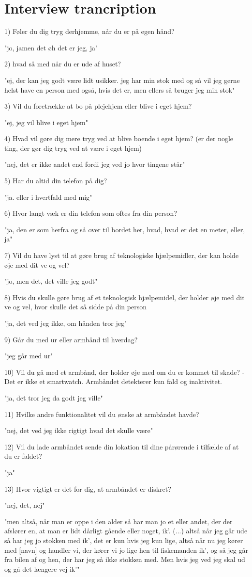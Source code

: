 \section{Interview trancription}

1) Føler du dig tryg derhjemme, når du er på egen hånd?

"jo, jamen det øh det er jeg, ja"

2) hvad så med når du er ude af huset?

"ej, der kan jeg godt være lidt usikker. jeg har min stok med og så vil jeg gerne helst have en person med også, hvis det er, men ellers så bruger jeg min stok"

3) Vil du foretrække at bo på plejehjem eller blive i eget hjem? 

"ej, jeg vil blive i eget hjem"

4) Hvad vil gøre dig mere tryg ved at blive boende i eget hjem? (er der nogle ting, der gør dig tryg ved at være i eget hjem)

"nej, det er ikke andet end fordi jeg ved jo hvor tingene står"

5) Har du altid din telefon på dig?

"ja. eller i hvertfald med mig"

6) Hvor langt væk er din telefon som oftes fra din person?

"ja, den er som herfra og så  over til bordet her, hvad, hvad er det en meter, eller, ja"

7) Vil du have lyst til at gøre brug af teknologiske hjælpemidler, der kan holde øje med dit ve og vel?

"jo, men det, det ville jeg godt"

8) Hvis du skulle gøre brug af et teknologisk hjælpemidel, der holder øje med dit ve og vel, hvor skulle det så sidde på din person

"ja, det ved jeg ikke, om hånden tror jeg"

9) Går du med ur eller armbånd til hverdag? 

"jeg går med ur"

10) Vil du gå med et armbånd, der holder øje med om du er kommet til skade?
- Det er ikke et smartwatch. Armbåndet detekterer kun fald og inaktivitet.

"ja, det tror jeg da godt jeg ville"

11) Hvilke andre funktionalitet vil du ønske at armbåndet havde? 

"nej, det ved jeg ikke rigtigt hvad det skulle være"

12) Vil du lade armbåndet sende din lokation til dine pårørende i tilfælde af at du er faldet? 

"ja"

13) Hvor vigtigt er det for dig, at armbåndet er diskret?

"nej, det, nej"

"men altså, når man er oppe i den alder så har man jo et eller andet, der der afslører en, at man er lidt dårligt gående eller noget, ik'. (...) altså når jeg går ude så har jeg jo stokken med ik', det er kun hvis jeg kun lige, altså når nu jeg kører med [navn] og handler vi, der kører vi jo lige hen til fiskemanden ik', og så jeg går fra bilen af og hen, der har jeg så ikke stokken med. Men hvis jeg ved jeg skal ud og gå det længere vej ik'"
